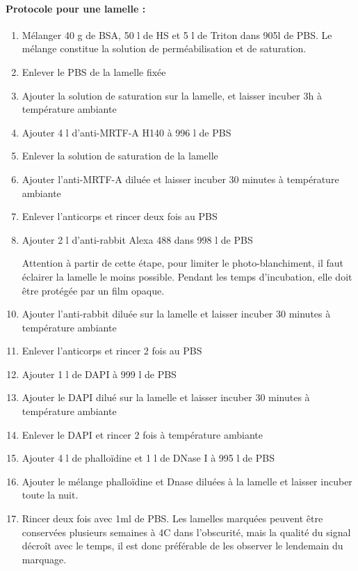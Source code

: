 \paragraph{Protocole pour une lamelle : }
\begin{enumerate}
\item Mélanger 40 \micro g de BSA, 50 \micro l de HS et 5 \micro l de Triton dans 905\micro l de PBS. Le mélange constitue la solution de perméabilisation et de saturation.
\item Enlever le PBS de la lamelle fixée
\item Ajouter la solution de saturation sur la lamelle, et laisser incuber 3h à température ambiante
\item Ajouter 4 \micro l d'anti-MRTF-A H140 à 996 \micro l de PBS
\item Enlever la solution de saturation de la lamelle
\item Ajouter l'anti-MRTF-A diluée et laisser incuber 30 minutes à température ambiante
\item Enlever l'anticorps et rincer deux fois au PBS
\item Ajouter 2 \micro l d'anti-rabbit Alexa 488 dans 998 \micro l de PBS
\item[Attention] à partir de cette étape, pour limiter le photo-blanchiment, il faut éclairer la lamelle le moins possible. Pendant les temps d'incubation, elle doit être protégée par un film opaque. 
\item Ajouter l'anti-rabbit diluée sur la lamelle et laisser incuber 30 minutes à température ambiante
\item Enlever l'anticorps et rincer 2 fois au PBS
\item Ajouter 1 \micro l de DAPI à 999 \micro l de PBS
\item Ajouter le DAPI dilué sur la lamelle et laisser incuber 30 minutes à température ambiante
\item Enlever le DAPI et rincer 2 fois à température ambiante
\item Ajouter 4 \micro l de phalloïdine et 1 \micro l de DNase I à 995 \micro l de PBS
\item Ajouter le mélange phalloïdine et Dnase diluées à la lamelle et laisser incuber toute la nuit.
\item Rincer deux fois avec 1ml de PBS. Les lamelles marquées peuvent être conservées plusieurs semaines à 4\degres C dans l'obscurité, mais la qualité du signal décroît avec le temps, il est donc préférable de les observer le lendemain du marquage.

\end{enumerate}

